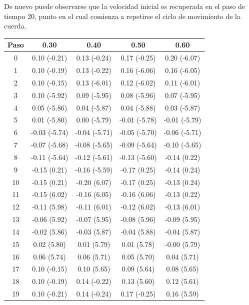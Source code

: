 \documentclass[11pt]{article}
\begin{document}
De nuevo puede observarse que la velocidad inicial es recuperada en el paso de tiempo 20,
punto en el cual comienza a repetirse el ciclo de movimiento de la cuerda.

\begin{table}[t]
\center
\begin{small}
\begin{tabular}{ c c c c c }
\hline
Paso & 0.30 & 0.40 & 0.50 & 0.60 \\
\hline
\hline
0 & 0.10 (-0.21) & 0.13 (-0.24) & 0.17 (-0.25) & 0.20 (-6.07) \\
1 & 0.10 (-0.19) & 0.13 (-0.22) & 0.16 (-6.06) & 0.16 (-6.05) \\
2 & 0.10 (-0.15) & 0.13 (-6.01) & 0.12 (-6.02) & 0.11 (-6.01) \\
3 & 0.10 (-5.92) & 0.09 (-5.95) & 0.08 (-5.96) & 0.07 (-5.95) \\
4 & 0.05 (-5.86) & 0.04 (-5.87) & 0.04 (-5.88) & 0.03 (-5.87) \\
5 & 0.01 (-5.80) & 0.00 (-5.79) & -0.01 (-5.78) & -0.01 (-5.79) \\
6 & -0.03 (-5.74) & -0.04 (-5.71) & -0.05 (-5.70) & -0.06 (-5.71) \\
7 & -0.07 (-5.68) & -0.08 (-5.65) & -0.09 (-5.64) & -0.10 (-5.65) \\
8 & -0.11 (-5.64) & -0.12 (-5.61) & -0.13 (-5.60) & -0.14 (0.22) \\
9 & -0.15 (0.21) & -0.16 (-5.59) & -0.17 (0.25) & -0.14 (0.24) \\
10 & -0.15 (0.21) & -0.20 (6.07) & -0.17 (0.25) & -0.13 (0.24) \\
11 & -0.15 (6.02) & -0.16 (6.05) & -0.16 (6.06) & -0.13 (0.22) \\
12 & -0.11 (5.98) & -0.11 (6.01) & -0.12 (6.02) & -0.13 (6.01) \\
13 & -0.06 (5.92) & -0.07 (5.95) & -0.08 (5.96) & -0.09 (5.95) \\
14 & -0.02 (5.86) & -0.03 (5.87) & -0.04 (5.88) & -0.04 (5.87) \\
15 & 0.02 (5.80) & 0.01 (5.79) & 0.01 (5.78) & -0.00 (5.79) \\
16 & 0.06 (5.74) & 0.06 (5.71) & 0.05 (5.70) & 0.04 (5.71) \\
17 & 0.10 (-0.15) & 0.10 (5.65) & 0.09 (5.64) & 0.08 (5.65) \\
18 & 0.10 (-0.19) & 0.14 (-0.22) & 0.13 (5.60) & 0.12 (5.61) \\
19 & 0.10 (-0.21) & 0.14 (-0.24) & 0.17 (-0.25) & 0.16 (5.59) \\

\end{tabular}
\end{small}
\end{table}
\end{document}
